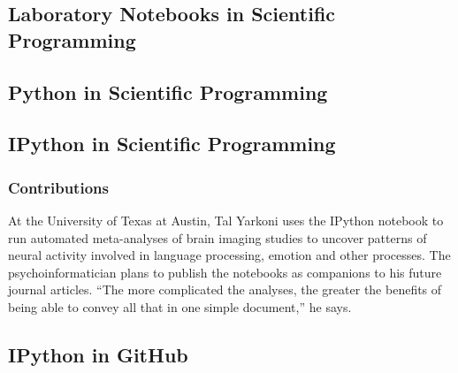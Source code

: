 \subsection{Laboratory Notebooks in Scientific Programming}

\subsection{Python in Scientific Programming}




\subsection{IPython in Scientific Programming}



\subsubsection{Contributions}


At the University of Texas at Austin, Tal Yarkoni
uses the IPython notebook to run automated
meta-analyses of brain imaging studies to
uncover patterns of neural activity involved in
language processing, emotion and other processes.
The psychoinformatician plans to publish
the notebooks as companions to his future
journal articles. “The more complicated the
analyses, the greater the benefits of being able to convey all that in one simple document,” he says.
\cite{shen2014interactive}

\subsection{IPython in GitHub}
